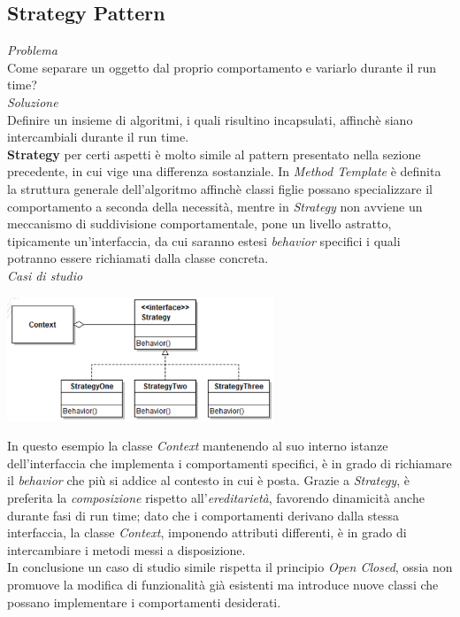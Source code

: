 \documentclass{article}
\begin{document}
\subsection*{Strategy Pattern}
\large
\textit{Problema}\\
Come separare un oggetto dal proprio comportamento e variarlo durante il run time?\vspace*{7pt}\\
\textit{Soluzione}\\
Definire un insieme di algoritmi, i quali risultino incapsulati, affinchè siano intercambiali durante il run time.\vspace*{14pt}\\
\textbf{Strategy} per certi aspetti è molto simile al pattern presentato nella sezione precedente, in cui vige una differenza sostanziale. In \textit{Method Template} è definita la struttura generale dell'algoritmo affinchè classi figlie possano specializzare il comportamento a seconda della necessità, mentre in \textit{Strategy} non avviene un meccanismo di suddivisione comportamentale, pone un livello astratto, tipicamente un'interfaccia, da cui saranno estesi \textit{behavior} specifici i quali potranno essere richiamati dalla classe concreta.\vspace*{14pt}\\
\textit{Casi di studio}\\
\begin{center}
    \includegraphics[width=0.6\textwidth]{foto 6.png}
\end{center}
In questo esempio la classe \textit{Context} mantenendo al suo interno istanze dell'interfaccia che implementa i comportamenti specifici, è in grado di richiamare il \textit{behavior} che più si addice al contesto in cui è posta. Grazie a \textit{Strategy}, è preferita la \textit{composizione} rispetto all'\textit{ereditarietà}, favorendo dinamicità anche durante fasi di run time; dato che i comportamenti derivano dalla stessa interfaccia, la classe \textit{Context}, imponendo attributi differenti, è in grado di intercambiare i metodi messi a disposizione.\vspace*{7pt}\\
In conclusione un caso di studio simile rispetta il principio \textit{Open Closed}, ossia non promuove la modifica di funzionalità già esistenti ma introduce nuove classi che possano implementare i comportamenti desiderati.
\end{document}
